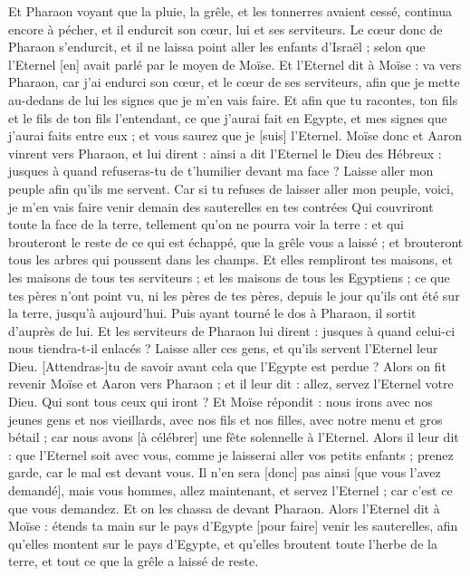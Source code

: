 \begin{multicols}{2}
Et Pharaon voyant que la pluie, la grêle, et les tonnerres avaient cessé, continua encore à pécher, et il endurcit son cœur, lui et ses serviteurs.
Le cœur donc de Pharaon s'endurcit, et il ne laissa point aller les enfants d'Israël ; selon que l'Eternel [en] avait parlé par le moyen de Moïse.
\VerseOne{}Et l'Eternel dit à Moïse : va vers Pharaon, car j'ai endurci son cœur, et le cœur de ses serviteurs, afin que je mette au-dedans de lui les signes que je m'en vais faire.
Et afin que tu racontes, ton fils et le fils de ton fils l'entendant, ce que j'aurai fait en Egypte, et mes signes que j'aurai faits entre eux ; et vous saurez que je [suis] l'Eternel.
Moïse donc et Aaron vinrent vers Pharaon, et lui dirent : ainsi a dit l'Eternel le Dieu des Hébreux : jusques à quand refuseras-tu de t'humilier devant ma face ? Laisse aller mon peuple afin qu'ils me servent.
Car si tu refuses de laisser aller mon peuple, voici, je m'en vais faire venir demain des sauterelles en tes contrées
Qui couvriront toute la face de la terre, tellement qu'on ne pourra voir la terre : et qui brouteront le reste de ce qui est échappé, que la grêle vous a laissé ; et brouteront tous les arbres qui poussent dans les champs.
Et elles rempliront tes maisons, et les maisons de tous tes serviteurs ; et les maisons de tous les Egyptiens ; ce que tes pères n'ont point vu, ni les pères de tes pères, depuis le jour qu'ils ont été sur la terre, jusqu'à aujourd'hui. Puis ayant tourné le dos à Pharaon, il sortit d'auprès de lui.
Et les serviteurs de Pharaon lui dirent : jusques à quand celui-ci nous tiendra-t-il enlacés ? Laisse aller ces gens, et qu'ils servent l'Eternel leur Dieu. [Attendras-]tu de savoir avant cela que l'Egypte est perdue ?
Alors on fit revenir Moïse et Aaron vers Pharaon ; et il leur dit : allez, servez l'Eternel votre Dieu. Qui sont tous ceux qui iront ?
Et Moïse répondit : nous irons avec nos jeunes gens et nos vieillards, avec nos fils et nos filles, avec notre menu et gros bétail ; car nous avons [à célébrer] une fête solennelle à l'Eternel.
Alors il leur dit : que l'Eternel soit avec vous, comme je laisserai aller vos petits enfants ; prenez garde, car le mal est devant vous.
Il n'en sera [donc] pas ainsi [que vous l'avez demandé], mais vous hommes, allez maintenant, et servez l'Eternel ; car c'est ce que vous demandez. Et on les chassa de devant Pharaon.
Alors l'Eternel dit à Moïse : étends ta main sur le pays d'Egypte [pour faire] venir les sauterelles, afin qu'elles montent sur le pays d'Egypte, et qu'elles broutent toute l'herbe de la terre, et tout ce que la grêle a laissé de reste.

\end{multicols}
